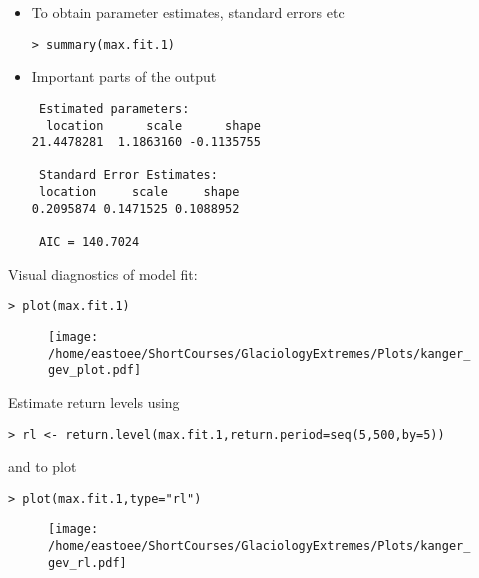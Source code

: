 \documentclass[dvipsnames]{beamer}
\begin{document}
\begin{frame}[fragile]
\begin{itemize}
\item
To obtain parameter estimates, standard errors etc 
\begin{verbatim}
> summary(max.fit.1)
\end{verbatim}
\item
Important parts of the output
\begin{verbatim}
 Estimated parameters:
  location      scale      shape 
21.4478281  1.1863160 -0.1135755 

 Standard Error Estimates:
 location     scale     shape 
0.2095874 0.1471525 0.1088952 

 AIC = 140.7024 
\end{verbatim}
\end{itemize}
\end{frame}

\begin{frame}[fragile]
Visual diagnostics of model fit:
\begin{verbatim}
> plot(max.fit.1)
\end{verbatim}
\begin{figure}
\centering
{\texttt{[image: /home/eastoee/ShortCourses/GlaciologyExtremes/Plots/kanger\_gev\_plot.pdf]}}
\end{figure}
\end{frame}

\begin{frame}[fragile]
Estimate return levels using
\begin{verbatim}
> rl <- return.level(max.fit.1,return.period=seq(5,500,by=5))
\end{verbatim}
and to plot
\begin{verbatim}
> plot(max.fit.1,type="rl")
\end{verbatim}

\begin{figure}
\centering
{\texttt{[image: /home/eastoee/ShortCourses/GlaciologyExtremes/Plots/kanger\_gev\_rl.pdf]}}
\end{figure}
\end{frame}
\end{document}

